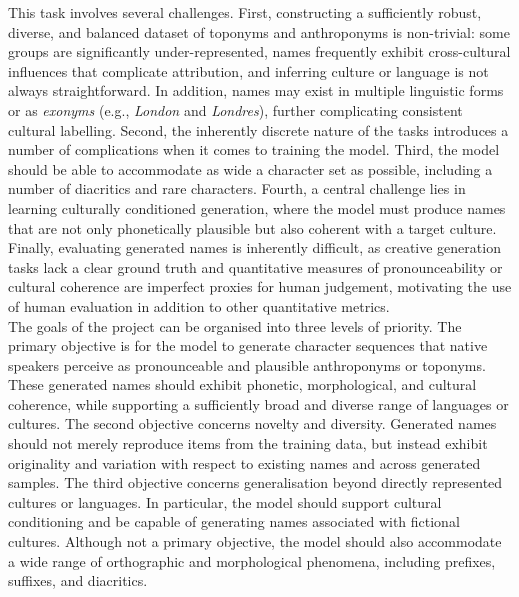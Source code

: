 \documentclass[Main.tex]{subfiles}
\begin{document}
This task involves several challenges. First, constructing a sufficiently robust, diverse, and balanced dataset of toponyms and anthroponyms is non-trivial: some groups are significantly under-represented, names frequently exhibit cross-cultural influences that complicate attribution, and inferring culture or language is not always straightforward. In addition, names may exist in multiple linguistic forms or as \textit{exonyms} (e.g., \textit{London} and \textit{Londres}), further complicating consistent cultural labelling. Second, the inherently discrete nature of the tasks introduces a number of complications when it comes to training the model. Third, the model should be able to accommodate as wide a character set as possible, including a number of diacritics and rare characters. Fourth, a central challenge lies in learning culturally conditioned generation, where the model must produce names that are not only phonetically plausible but also coherent with a target culture. Finally, evaluating generated names is inherently difficult, as creative generation tasks lack a clear ground truth and quantitative measures of pronounceability or cultural coherence are imperfect proxies for human judgement, motivating the use of human evaluation in addition to other quantitative metrics.\\

The goals of the project can be organised into three levels of priority. The primary objective is for the model to generate character sequences that native speakers perceive as pronounceable and plausible anthroponyms or toponyms. These generated names should exhibit phonetic, morphological, and cultural coherence, while supporting a sufficiently broad and diverse range of languages or cultures. The second objective concerns novelty and diversity. Generated names should not merely reproduce items from the training data, but instead exhibit originality and variation with respect to existing names and across generated samples. The third objective concerns generalisation beyond directly represented cultures or languages. In particular, the model should support cultural conditioning and be capable of generating names associated with fictional cultures. Although not a primary objective, the model should also accommodate a wide range of orthographic and morphological phenomena, including prefixes, suffixes, and diacritics.\\
\end{document}
